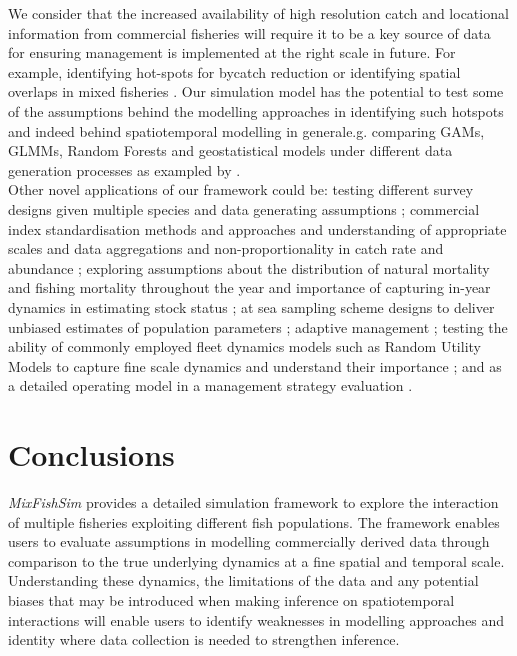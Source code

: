 \documentclass[review]{elsarticle}
\begin{document}
We consider that the increased availability of high resolution catch and
locational information from commercial fisheries will require it to be a key
source of data for ensuring management is implemented at the right scale in
future. For example, identifying hot-spots for bycatch reduction or identifying
spatial overlaps in mixed fisheries \citep{Dolder2018, Gardner2008, Little2014,
	Dedman2015, Ward2015}. Our simulation model has the potential to test
some of the assumptions behind the modelling approaches in identifying such
hotspots and indeed behind spatiotemporal modelling in general\replaced{, }{
	(}e.g. comparing GAMs, GLMMs, Random Forests and geostatistical models
under different data generation processes as exampled by
\cite{Stock2019}\deleted{)}. \\

Other novel applications of our framework could be: testing different survey
designs given multiple species and data generating assumptions \citep{Xu2015};
commercial index standardisation methods and approaches and understanding of
appropriate scales and data aggregations and non-proportionality in catch rate
and abundance \citep{Harley2001, Maunder2004}; exploring assumptions about the
distribution of natural mortality and fishing mortality throughout the year and
importance of capturing in-year dynamics in estimating stock status
\citep{Liu2013}; at sea sampling scheme designs to deliver unbiased estimates
of population parameters \citep{Cotter2007, Kimura2006}; adaptive management
\citep{Walters2007, Dunn2016}; testing the ability of commonly employed fleet
dynamics models such as Random Utility Models to capture fine scale dynamics
and understand their importance \citep{Girardin2016}; and as a detailed
operating model in a management strategy evaluation \citep{Mahevas2004}. \\

\section{Conclusions}

\textit{MixFishSim} provides a detailed simulation framework to explore the
interaction of multiple fisheries exploiting different fish populations. The
framework enables users to evaluate assumptions in modelling commercially
derived data through comparison to the true underlying dynamics at a fine
spatial and temporal scale.  Understanding these dynamics, the limitations of
the data and any potential biases that may be introduced when making inference
on spatiotemporal interactions will enable users to identify weaknesses in
modelling approaches and identity where data collection is needed to strengthen
inference. \\
\end{document}
